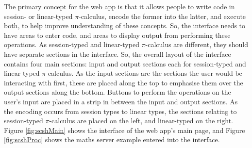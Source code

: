 \documentclass{l4proj}
\begin{document}
\quad The primary concept for the web app is that it allows people to write code in session- or linear-typed $\pi$-calculus, encode the former into the latter, and execute both, to help improve understanding of these concepts. So, the interface needs to have areas to enter code, and areas to display output from performing these operations. As session-typed and linear-typed $\pi$-calculus are different, they should have separate sections in the interface. So, the overall layout of the interface contains four main sections: input and output sections each for session-typed and linear-typed $\pi$-calculus. As the input sections are the sections the user would be interacting with first, these are placed along the top to emphasise them over the output sections along the bottom. Buttons to perform the operations on the user's input are placed in a strip in between the input and output sections. As the encoding occurs from session types to linear types, the sections relating to session-typed $\pi$-calculus are placed on the left, and linear-typed on the right. Figure \ref{fig:scshMain} shows the interface of the web app's main page, and Figure \ref{fig:scshProc} shows the maths server example entered into the interface.
\end{document}
